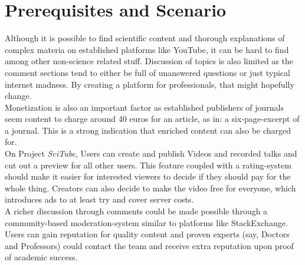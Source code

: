\section{Prerequisites and Scenario}\label{sec:ch1}

Although it is possible to find scientific content and thorough explanations
of complex materia on established platforms like YouTube, it can be
hard to find among other non-science related stuff. Discussion of topics 
is also limited as the comment sections tend to either be full of unanswered questions
or just typical internet madness. By creating a platform for professionals,
that might hopefully change.\\

Monetization is also an important factor as established publishers of journals
seem content to charge around 40 euros for an article, as in: a six-page-excerpt of a journal.
This is a strong indication that enriched content can also be charged for.\\
On Project \textit{SciTube}, Users can create and publish Videos and recorded 
talks and cut out a preview for all other
users. This feature coupled with a rating-system should make it easier 
for interested viewers to decide if they should pay for the whole thing.
Creators can also decide to make the video free for everyone, which 
introduces ads to at least try and cover server costs.\\
A richer discussion through comments could be made possible through a 
community-based moderation-system similar to platforms like StackExchange.
Users can gain reputation for quality content and proven experts
(say, Doctors and Professors) could contact the team and receive extra reputation
upon proof of academic success.


